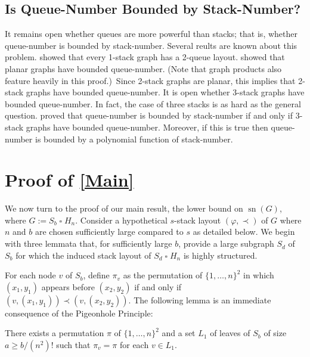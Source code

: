 \documentclass[kpfonts]{patmorin}
\DeclareMathOperator{\sn}{sn}
\renewcommand{\ge}{\geqslant}
\newcommand{\CartProd}{\mathbin{\square}}
\begin{document}

\subsection*{Is Queue-Number Bounded by Stack-Number? }

It remains open whether queues are more powerful than stacks; that is, whether queue-number is bounded by stack-number. Several reults are known about this problem. \citet{HLR92} showed that every 1-stack graph has a 2-queue layout. \citet{DJMMUW20} showed that planar graphs have bounded queue-number. (Note that graph products also feature heavily in this proof.)\ Since 2-stack graphs are planar, this implies that 2-stack graphs have bounded queue-number. It is open whether 3-stack graphs have bounded queue-number. In fact, the case of three stacks is as hard as the general question. \citet{DujWoo05} proved that queue-number is bounded by stack-number if and only if 3-stack graphs have bounded queue-number. Moreover, if this is true then queue-number is bounded by a polynomial function of stack-number.

\section{Proof of \cref{Main}}

We now turn to the proof of our main result, the lower bound on $\sn(G)$, where $G:= S_b\CartProd H_n$. Consider a hypothetical $s$-stack layout $(\varphi,\prec)$ of $G$ where $n$ and $b$ are chosen sufficiently large compared to $s$ as detailed below. We begin with three lemmata that, for sufficiently large $b$, provide a large subgraph $S_d$ of $S_b$ for which the induced stack layout of $S_d\CartProd H_n$ is highly structured.

For each node $v$ of $S_b$, define $\pi_v$ as the permutation of $\{1,\ldots,n\}^2$ in which $(x_1,y_1)$ appears before $(x_2,y_2)$ if and only if $(v,(x_1,y_1))\prec (v,(x_2,y_2))$. The following lemma is an immediate consequence of the Pigeonhole Principle:

\begin{lem}\label{uniform_order}
    There exists a permutation $\pi$ of $\{1,\ldots,n\}^2$ and a set $L_1$ of leaves of $S_b$ of size $a\ge b/(n^2)!$ such that $\pi_{v}=\pi$ for each $v\in L_1$.
\end{lem}
\end{document}
